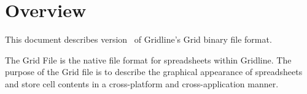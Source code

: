 \chapter{Overview}

This document describes version \specver~of Gridline's Grid binary file format.

The Grid File is the native file format for spreadsheets within Gridline. The 
purpose of the Grid file is to describe the graphical appearance of 
spreadsheets and store cell contents in a cross-platform and cross-application
manner.

